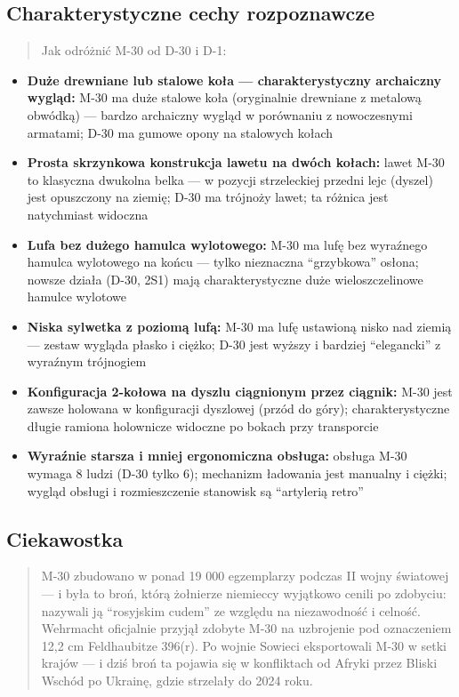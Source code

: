 \documentclass[12pt,oneside]{book}
\providecommand{\tightlist}{%
  \setlength{\itemsep}{0pt}\setlength{\parskip}{0pt}}
\begin{document}
\subsection{Charakterystyczne cechy
rozpoznawcze}\label{charakterystyczne-cechy-rozpoznawcze-27}

\begin{quote}
Jak odróżnić M-30 od D-30 i D-1:
\end{quote}

\begin{itemize}
\tightlist
\item
  \textbf{Duże drewniane lub stalowe koła --- charakterystyczny
  archaiczny wygląd:} M-30 ma duże stalowe koła (oryginalnie drewniane z
  metalową obwódką) --- bardzo archaiczny wygląd w porównaniu z
  nowoczesnymi armatami; D-30 ma gumowe opony na stalowych kołach
\item
  \textbf{Prosta skrzynkowa konstrukcja lawetu na dwóch kołach:} lawet
  M-30 to klasyczna dwukolna belka --- w pozycji strzeleckiej przedni
  lejc (dyszel) jest opuszczony na ziemię; D-30 ma trójnoży lawet; ta
  różnica jest natychmiast widoczna
\item
  \textbf{Lufa bez dużego hamulca wylotowego:} M-30 ma lufę bez
  wyraźnego hamulca wylotowego na końcu --- tylko nieznaczna
  ``grzybkowa'' osłona; nowsze działa (D-30, 2S1) mają charakterystyczne
  duże wieloszczelinowe hamulce wylotowe
\item
  \textbf{Niska sylwetka z poziomą lufą:} M-30 ma lufę ustawioną nisko
  nad ziemią --- zestaw wygląda płasko i ciężko; D-30 jest wyższy i
  bardziej ``elegancki'' z wyraźnym trójnogiem
\item
  \textbf{Konfiguracja 2-kołowa na dyszlu ciągnionym przez ciągnik:}
  M-30 jest zawsze holowana w konfiguracji dyszlowej (przód do góry);
  charakterystyczne długie ramiona holownicze widoczne po bokach przy
  transporcie
\item
  \textbf{Wyraźnie starsza i mniej ergonomiczna obsługa:} obsługa M-30
  wymaga 8 ludzi (D-30 tylko 6); mechanizm ładowania jest manualny i
  ciężki; wygląd obsługi i rozmieszczenie stanowisk są ``artylerią
  retro''
\end{itemize}

\subsection{Ciekawostka}\label{ciekawostka-27}

\begin{quote}
M-30 zbudowano w ponad 19 000 egzemplarzy podczas II wojny światowej ---
i była to broń, którą żołnierze niemieccy wyjątkowo cenili po zdobyciu:
nazywali ją ``rosyjskim cudem'' ze względu na niezawodność i celność.
Wehrmacht oficjalnie przyjął zdobyte M-30 na uzbrojenie pod oznaczeniem
12,2 cm Feldhaubitze 396(r). Po wojnie Sowieci eksportowali M-30 w setki
krajów --- i dziś broń ta pojawia się w konfliktach od Afryki przez
Bliski Wschód po Ukrainę, gdzie strzelały do 2024 roku.
\end{quote}
\end{document}
